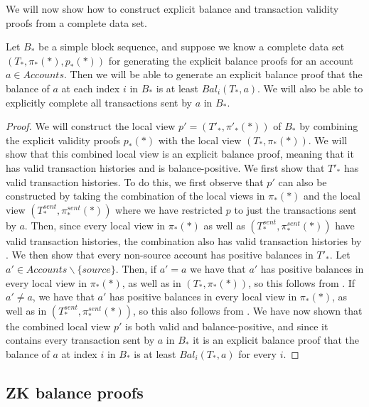 We will now show how to construct explicit balance and transaction validity proofs from a complete data set.

\begin{theorem}\label{theorem:proof-of-balance-in-honest-transaction-map-sequence}
  Let \(B_*\) be a simple block sequence, and suppose we know a complete data set \((T_*,\pi_*(*), p_*(*))\) for generating the explicit balance proofs for an account \(a \in Accounts\). Then we will be able to generate an explicit balance proof that the balance of \(a\) at each index \(i\) in \(B_*\) is at least \(Bal_i(T_*,a)\). We will also be able to explicitly complete all transactions sent by \(a\) in \(B_*\).
\end{theorem}

\begin{proof}
  We will construct the local view \(p' = (T'_*,\pi'_*(*))\) of \(B_*\) by combining the explicit validity proofs \(p_*(*)\) with the local view \((T_*,\pi_*(*))\). We will show that this combined local view is an explicit balance proof, meaning that it has valid transaction histories and is balance-positive. We first show that \(T'_*\) has valid transaction histories. To do this, we first observe that \(p'\) can also be constructed by taking the combination of the local views in \(\pi_*(*)\) and the local view \((T^{sent}_*, \pi^{sent}_*(*))\) where we have restricted \(p\) to just the transactions sent by \(a\). Then, since every local view in \(\pi_*(*)\) as well as \((T^{sent}_*, \pi^{sent}_*(*))\) have valid transaction histories, the combination also has valid transaction histories by . We then show that every non-source account has positive balances in \(T'_*\). Let \(a' \in Accounts \backslash \{source\}\). Then, if \(a' = a\) we have that \(a'\) has positive balances in every local view in \(\pi_*(*)\), as well as in \((T_*,\pi_*(*))\), so this follows from . If \(a' \neq a\), we have that \(a'\) has positive balances in every local view in \(\pi_*(*)\), as well as in \((T^{sent}_*, \pi^{sent}_*(*))\), so this also follows from . We have now shown that the combined local view \(p'\) is both valid and balance-positive, and since it contains every transaction sent by \(a\) in \(B_*\) it is an explicit balance proof that the balance of \(a\) at index \(i\) in \(B_*\) is at least \(Bal_i(T_*,a)\) for every \(i\).
\end{proof}

\subsection{ZK balance proofs}

